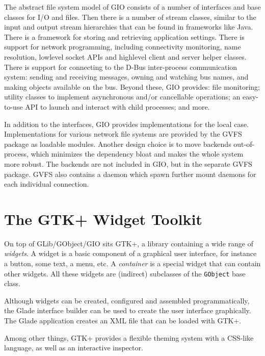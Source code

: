 \documentclass[a4paper,notumble]{leaflet}
\begin{document}
The abstract file system model of GIO consists of a number of interfaces and base classes for I/O and files. Then there is a number of stream classes, similar to the input and output stream hierarchies that can be found in frameworks like Java. There is a framework for storing and retrieving application settings. There is support for network programming, including connectivity monitoring, name resolution, lowlevel socket APIs and highlevel client and server helper classes. There is support for connecting to the D-Bus inter-process communication system: sending and receiving messages, owning and watching bus names, and making objects available on the bus. Beyond these, GIO provides: file monitoring; utility classes to implement asynchronous and/or cancellable operations; an easy-to-use API to launch and interact with child processes; and more.

In addition to the interfaces, GIO provides implementations for the local case. Implementations for various network file systems are provided by the GVFS package as loadable modules. Another design choice is to move backends out-of-process, which minimizes the dependency bloat and makes the whole system more robust. The backends are not included in GIO, but in the separate GVFS package. GVFS also contains a daemon which spawn further mount daemons for each individual connection.

\pagebreak
\section{The GTK+ Widget Toolkit}

On top of GLib/GObject/GIO sits GTK+, a library containing a wide range of \textit{widgets}. A widget is a basic component of a graphical user interface, for instance a button, some text, a menu, etc. A \textit{container} is a special widget that can contain other widgets. All these widgets are (indirect) subclasses of the \texttt{GObject} base class.

Although widgets can be created, configured and assembled programmatically, the Glade interface builder can be used to create the user interface graphically. The Glade application creates an XML file that can be loaded with GTK+.

Among other things, GTK+ provides a flexible theming system with a CSS-like language, as well as an interactive inspector.
\end{document}
